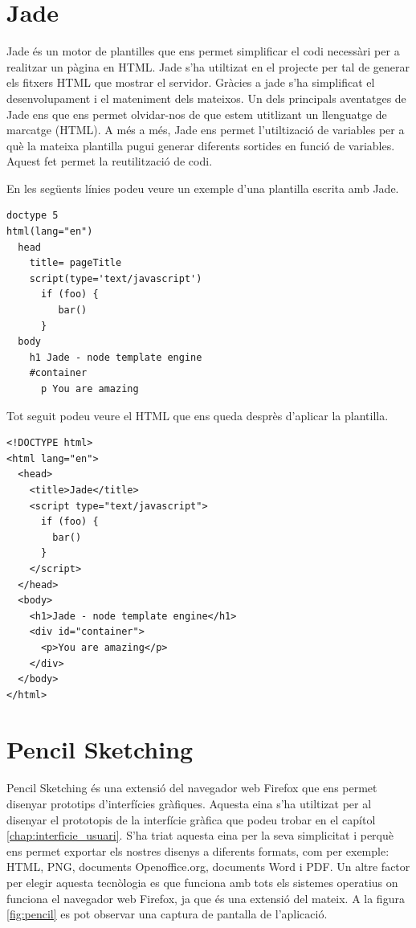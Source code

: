 \section{Jade}

Jade és un motor de plantilles que ens permet simplificar el codi necessàri per a realitzar un pàgina en HTML. Jade s'ha utiltizat en el projecte per tal de generar els fitxers HTML que mostrar el servidor. Gràcies a jade s'ha simplificat el desenvolupament i el mateniment dels mateixos. Un dels principals aventatges de Jade ens que ens permet olvidar-nos de que estem utitlizant un llenguatge de marcatge (HTML). A més a més, Jade ens permet l'utiltizació de variables per a què la mateixa plantilla pugui generar diferents sortides en funció de variables. Aquest fet permet la reutilització de codi.

En les següents línies podeu veure un exemple d'una plantilla escrita amb Jade. 

\begin{lstlisting}
doctype 5
html(lang="en")
  head
    title= pageTitle
    script(type='text/javascript')
      if (foo) {
         bar()
      }
  body
    h1 Jade - node template engine
    #container
      p You are amazing
\end{lstlisting}

Tot seguit podeu veure el HTML que ens queda desprès d'aplicar la plantilla. 

\begin{lstlisting}
<!DOCTYPE html>
<html lang="en">
  <head>
    <title>Jade</title>
    <script type="text/javascript">
      if (foo) {
      	bar()
      }
    </script>
  </head>
  <body>
    <h1>Jade - node template engine</h1>
    <div id="container">
      <p>You are amazing</p>
    </div>
  </body>
</html>	
\end{lstlisting}

\section{Pencil Sketching}
\label{sec:pencil sketcing}
Pencil Sketching és una extensió del navegador web Firefox que ens permet disenyar prototips d'interfícies gràfiques. Aquesta eina s'ha utiltizat per al disenyar el prototopis de la interfície gràfica que podeu trobar en el capítol \ref{chap:interficie_usuari}. S'ha triat aquesta eina per la seva simplicitat i perquè ens permet exportar els nostres disenys a diferents formats, com per exemple: HTML, PNG, documents Openoffice.org, documents Word i PDF. Un altre factor per elegir aquesta tecnòlogia es que funciona amb tots els sistemes operatius on funciona el navegador web Firefox, ja que és una extensió del mateix. A la figura \ref{fig:pencil} es pot observar una captura de pantalla de l'aplicació. 

